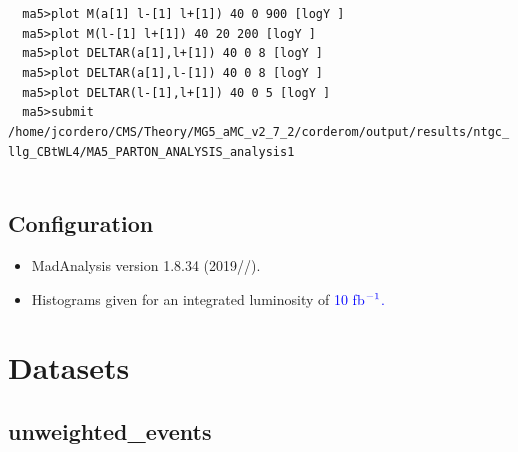 \documentclass[a4paper, 10pt]{article}
\begin{document}
\texttt{ }\texttt{ }\texttt{ma5>plot M(a[1] l-[1] l+[1]) 40 0 900 [logY ]\\
}
\texttt{ }\texttt{ }\texttt{ma5>plot M(l-[1] l+[1])      40 20 200 [logY ]\\
}
\texttt{ }\texttt{ }\texttt{ma5>plot DELTAR(a[1],l+[1])  40 0 8 [logY ]\\
}
\texttt{ }\texttt{ }\texttt{ma5>plot DELTAR(a[1],l-[1])  40 0 8 [logY ]\\
}
\texttt{ }\texttt{ }\texttt{ma5>plot DELTAR(l-[1],l+[1]) 40 0 5 [logY ]\\
}
\texttt{ }\texttt{ }\texttt{ma5>submit /\-home/\-jcordero/\-CMS/\-Theory/\-MG5\_aMC\_v2\_7\_2/\-corderom/\-output/\-results/\-ntgc\_llg\_CBtWL4/\-MA5\_PARTON\_ANALYSIS\_analysis1\\
}
\texttt{ }\texttt{ }\subsection{ Configuration}

\begin{itemize}
  \item MadAnalysis version 1.8.34 (2019//).
   \item Histograms given for an integrated luminosity of \textcolor{blue}{10}\textcolor{blue}{ fb}$^{\textcolor{blue}{-1}}$\textcolor{blue}{.}
\textcolor{blue}{}
\end{itemize}
\newpage
\section{ Datasets}

\subsection{ unweighted\_events}
\end{document}
